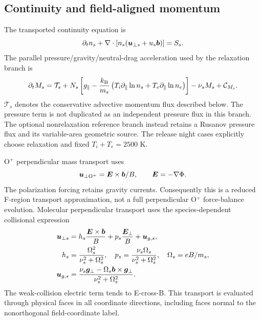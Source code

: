 \subsection{Continuity and field-aligned momentum}
The transported continuity equation is
\begin{equation}
 \partial_t n_s+\nabla\cdot[n_s(\bm u_{\perp s}+u_s\bm b)]=S_s.
 \label{eq:continuity}
\end{equation}
The parallel pressure/gravity/neutral-drag acceleration used by the relaxation
branch is
\begin{equation}
 \partial_t M_s=\mathcal T_s+
 N_s\left[g_\parallel-\frac{k_{\rm B}}{m_s}
 \left(T_i\partial_\parallel\ln n_s+T_e\partial_\parallel\ln n_e\right)\right]
 -\nu_sM_s+\mathcal C_{M_s}.
 \label{eq:momentum}
\end{equation}
$\mathcal T_s$ denotes the conservative advective momentum flux described
below. The pressure term is not duplicated as an independent pressure flux
in this branch. The optional nonrelaxation reference branch instead retains
a Rusanov pressure flux and its variable-area geometric source. The release
night cases explicitly choose relaxation and fixed $T_i+T_e=2500$ K.

O$^+$ perpendicular mass transport uses
\begin{equation}\bm u_{\perp\rm O^+}=\bm E\times\bm b/B,\qquad \bm E=-\nabla\Phi.\end{equation}
The polarization forcing retains gravity currents. Consequently this is a
reduced F-region transport approximation, not a full perpendicular O$^+$
force-balance evolution. Molecular perpendicular transport uses the
species-dependent collisional expression
\begin{align}
 \bm u_{\perp s}&=h_s\frac{\bm E\times\bm b}{B}
              +p_s\frac{\bm E_\perp}{B}+\bm u_{g,s},\\
 h_s&=\frac{\Omega_s^2}{\nu_s^2+\Omega_s^2},\quad
 p_s=\frac{\nu_s\Omega_s}{\nu_s^2+\Omega_s^2},\quad
 \Omega_s=eB/m_s,\\
 \bm u_{g,s}&=\frac{\nu_s\bm g_\perp-\Omega_s\bm b\times\bm g_\perp}
                  {\nu_s^2+\Omega_s^2}.
 \label{eq:mobility}
\end{align}
The weak-collision electric term tends to E-cross-B. This transport is
evaluated through physical faces in all coordinate directions, including
faces normal to the nonorthogonal field-coordinate label.

